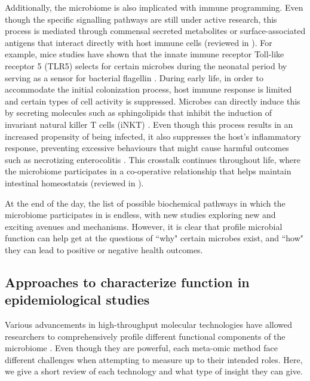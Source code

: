 Additionally, the microbiome is also implicated with immune programming. Even though the specific signalling pathways are still under active research, this process is mediated through commensal secreted metabolites or surface-associated antigens that interact directly with host immune cells (reviewed in \cite{belkaid2014role}). For example, mice studies have shown that the innate immune receptor Toll-like receptor 5 (TLR5) selects for certain microbes during the neonatal period by serving as a sensor for bacterial flagellin \cite{fulde2018neonatal}. During early life, in order to accommodate the initial colonization process, host immune response is limited and certain types of cell activity is suppressed. Microbes can directly induce this by secreting molecules such as sphingolipids that inhibit the induction of invariant natural killer T cells (iNKT) \cite{an2014sphingolipids}. Even though this process results in an increased propensity of being infected, it also suppresses the host's inflammatory response, preventing excessive behaviours that might cause harmful outcomes such as necrotizing enterocolitis \cite{neu2011necrotizing}. This crosstalk continues throughout life, where the microbiome participates in a co-operative relationship that helps maintain intestinal homeostatsis (reviewed in \cite{zheng2020interactions}). 

At the end of the day, the list of possible biochemical pathways in which the microbiome participates in is endless, with new studies exploring new and exciting avenues and mechanisms. However, it is clear that profile microbial function can help get at the questions of ``why" certain microbes exist, and ``how" they can lead to positive or negative health outcomes.  

\subsection{Approaches to characterize function in epidemiological studies}

Various advancements in high-throughput molecular technologies have allowed researchers to comprehensively profile different functional components of the microbiome \cite{foxman2015use}. Even though they are powerful, each meta-omic method face different challenges when attempting to measure up to their intended roles. Here, we give a short review of each technology and what type of insight they can give.  


